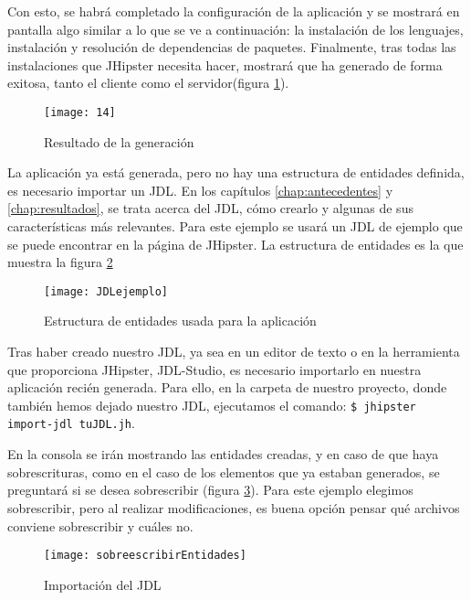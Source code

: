 Con esto, se habrá completado la configuración de la aplicación y se mostrará en pantalla algo similar a lo que se ve a continuación: la instalación de los lenguajes, instalación y resolución de dependencias de paquetes. Finalmente, tras todas las instalaciones que JHipster necesita hacer, mostrará que ha generado de forma exitosa, tanto el cliente como el servidor(figura \ref{fig:14}).

\begin{figure}[!h]
\begin{center}
\texttt{[image: 14]}
\caption{Resultado de la generación}
\label{fig:14}
\end{center}
\end{figure} 

La aplicación ya está generada, pero no hay una estructura de entidades definida, es necesario importar un JDL. En los capítulos \ref{chap:antecedentes} y \ref{chap:resultados}, se trata acerca del JDL, cómo crearlo y algunas de sus características más relevantes. Para este ejemplo se usará un JDL de ejemplo que se puede encontrar en la página de JHipster. La estructura de entidades es la que muestra la figura \ref{fig:JDLejemplo}

\begin{figure}[!h]
\begin{center}
\texttt{[image: JDLejemplo]}
\caption{Estructura de entidades usada para la aplicación}
\label{fig:JDLejemplo}
\end{center}
\end{figure}

Tras haber creado nuestro JDL, ya sea en un editor de texto o en la herramienta que proporciona JHipster, JDL-Studio, es necesario importarlo en nuestra aplicación recién generada. Para ello, en la carpeta de nuestro proyecto, donde también hemos dejado nuestro JDL, ejecutamos el comando: \texttt{\$ jhipster import-jdl tuJDL.jh}.

En la consola se irán mostrando las entidades creadas, y en caso de que haya sobrescrituras, como en el caso de los elementos que ya estaban generados, se preguntará si se desea sobrescribir (figura \ref{fig:sobreescribirEntidades}). Para este ejemplo elegimos sobrescribir, pero al realizar modificaciones, es buena opción pensar qué archivos conviene sobrescribir y cuáles no.

\begin{figure}[!h]
\begin{center}
\texttt{[image: sobreescribirEntidades]}
\caption{Importación del JDL}
\label{fig:sobreescribirEntidades}
\end{center}
\end{figure}

